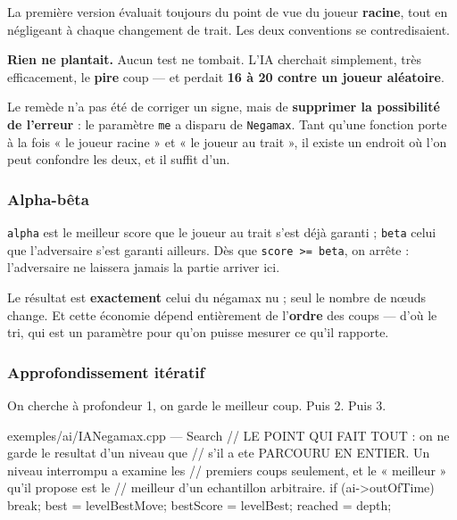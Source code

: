 \begin{nkpiege}
La première version évaluait toujours du point de vue du joueur \textbf{racine},
tout en négligeant à chaque changement de trait. Les deux conventions se
contredisaient.

\textbf{Rien ne plantait.} Aucun test ne tombait. L'IA cherchait simplement, très
efficacement, le \textbf{pire} coup — et perdait \textbf{16 à 20 contre un joueur
aléatoire}.

Le remède n'a pas été de corriger un signe, mais de \textbf{supprimer la
possibilité de l'erreur} : le paramètre \texttt{me} a disparu de
\texttt{Negamax}. Tant qu'une fonction porte à la fois « le joueur racine » et
« le joueur au trait », il existe un endroit où l'on peut confondre les deux, et
il suffit d'un.
\end{nkpiege}

\subsubsection{Alpha-bêta}

\texttt{alpha} est le meilleur score que le joueur au trait s'est déjà garanti ;
\texttt{beta} celui que l'adversaire s'est garanti ailleurs. Dès que
\texttt{score >= beta}, on arrête : l'adversaire ne laissera jamais la partie
arriver ici.

Le résultat est \textbf{exactement} celui du négamax nu ; seul le nombre de nœuds
change. Et cette économie dépend entièrement de l'\textbf{ordre} des coups — d'où
le tri, qui est un paramètre pour qu'on puisse mesurer ce qu'il rapporte.

\subsubsection{Approfondissement itératif}

On cherche à profondeur 1, on garde le meilleur coup. Puis 2. Puis 3.

\begin{nkcode}{exemples/ai/IANegamax.cpp — Search}
// LE POINT QUI FAIT TOUT : on ne garde le resultat d'un niveau que
// s'il a ete PARCOURU EN ENTIER. Un niveau interrompu a examine les
// premiers coups seulement, et le « meilleur » qu'il propose est le
// meilleur d'un echantillon arbitraire.
if (ai->outOfTime) break;
best      = levelBestMove;
bestScore = levelBest;
reached   = depth;
\end{nkcode}

